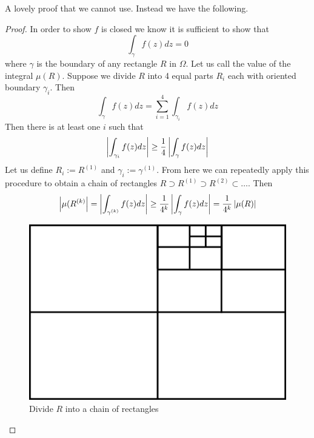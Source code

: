 A lovely proof that we cannot use. Instead we have the following.
\begin{proof}
In order to show $f$ is closed we know it is sufficient to show that 
$$ \int_\gamma f(z) dz = 0 $$
where $\gamma$ is the boundary of any rectangle $R$ in $\Omega$. Let us call the value of the integral $\mu(R)$. Suppose we divide $R$ into 4 equal parts $R_i$ each with oriented boundary $\gamma_i$. Then
$$ \int_\gamma f(z) dz = \sum_{i = 1}^4 \int_{\gamma_i} f(z) dz $$
Then there is at least one $i$ such that
$$ \left| \int_{\gamma_i} f(z) dz \right| \geq \frac{1}{4} \left| \int_\gamma f(z) dz \right| $$
Let us define $R_i := R^{(1)}$ and $\gamma_i := \gamma^{(1)}$. From here we can repeatedly apply this procedure to obtain a chain of rectangles $R \supset R^{(1)} \supset R^{(2)} \subset \dots$. Then
\begin{equation}\label{eq:cauchy-thm-ineq-1}
    \left|\mu(R^{(k)}\right| = \left|\int_{\gamma^{(k)}} f(z) dz\right| \geq  \frac{1}{4^k} \left| \int_\gamma f(z) dz \right| = \frac{1}{4^k} \left|\mu(R)\right|
\end{equation}
\begin{figure}[h]
    \centering
    \includegraphics{Images/cauchy_thm_division.png}
    \caption{Divide $R$ into a chain of rectangles}
    \label{fig:cauchy-thm-div}
\end{figure}


\end{proof}
